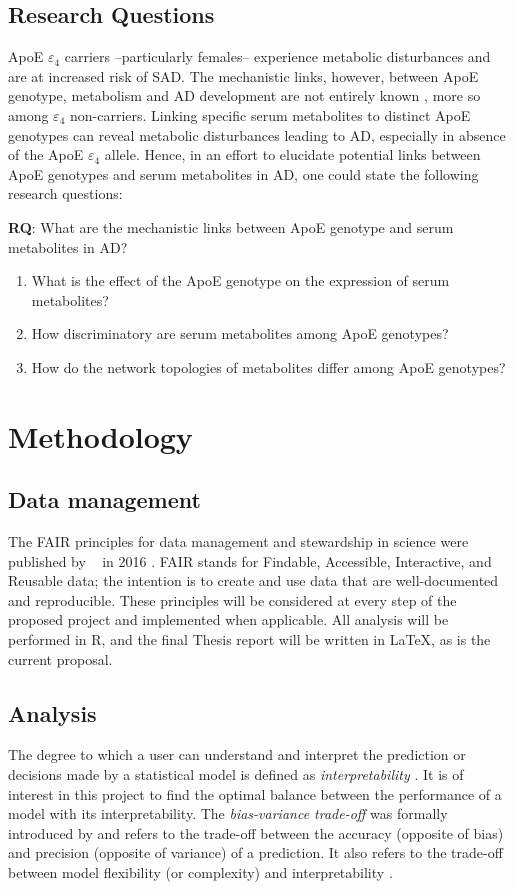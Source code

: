 \documentclass{amsart}
\theoremstyle{plain}
\begin{document}
\newpage
\subsection{Research Questions}
ApoE $\varepsilon_4$ carriers --particularly females-- experience metabolic disturbances and are at increased risk of SAD. The mechanistic links, however, between ApoE genotype, metabolism and AD development are not entirely known \cite{Fernandez-Calle2022APOEDiseases}, more so among $\varepsilon_4$ non-carriers. Linking specific serum metabolites to distinct ApoE genotypes can reveal metabolic disturbances leading to AD, especially in absence of the ApoE $\varepsilon_4$ allele. Hence, in an effort to elucidate potential links between ApoE genotypes and serum metabolites in AD, one could state the following research questions:

\textbf{RQ}: What are the mechanistic links between ApoE genotype and serum metabolites in AD?
\begin{enumerate}
    \item What is the effect of the ApoE genotype on the expression of serum metabolites?
    \item How discriminatory are serum metabolites among ApoE genotypes?
    \item How do the network topologies of metabolites differ among ApoE genotypes?
\end{enumerate}


\section{Methodology}

\newpage
\subsection{Data management}
The FAIR principles for data management and stewardship in science were published by  ~\citeauthor{Wilkinson2016TheStewardship} in 2016 \cite{Wilkinson2016TheStewardship}. FAIR stands for Findable, Accessible, Interactive, and Reusable data; the intention is to create and use data that are well-documented and reproducible. These principles will be considered at every step of the proposed project and implemented when applicable. All analysis will be performed in R, and the final Thesis report will be written in \LaTeX, as is the current proposal.

\subsection{Analysis}
The degree to which a user can understand and interpret the prediction or decisions made by a statistical model is defined as \textit{interpretability} \cite{Elshawi2019OnHypertension}. It is of interest in this project to find the optimal balance between the performance of a model with its interpretability. The \textit{bias-variance trade-off} was formally introduced by \citeauthor{Geman1992NeuralDilemma} and refers to the trade-off between the accuracy (opposite of bias) and precision (opposite of variance) of a prediction. It also refers to the trade-off between model flexibility (or complexity) and interpretability \cite{Geman1992NeuralDilemma}.
\end{document}
